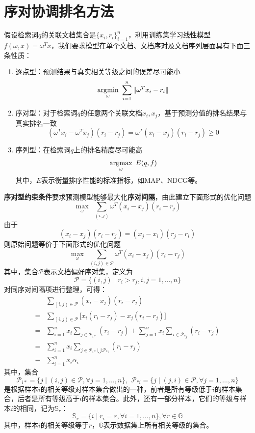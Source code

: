 \section{序对协调排名方法}
假设检索词$q$的关联文档集合是$\{x_i,r_i\}_{i=1}^n$，利用训练集学习线性模型$f(\omega,x)=\omega^T x$，我们要求模型在单个文档、文档序对及文档序列层面具有下面三条性质：
\begin{enumerate}
  \item 逐点型：预测结果与真实相关等级之间的误差尽可能小
  \[
    \operatorname*{\mathrm{\arg\!\min}}\limits_{\omega}~\sum\limits_{i=1}^n \|\omega^T x_i - r_i\|
  \]
  \item 序对型：对于检索词$q$的任意两个关联文档$x_i,x_j$，基于预测分值的排名结果与真实排名一致
  \[
    (\omega^T x_i - \omega^T x_j)(r_i - r_j) = \omega^T (x_i - x_j)(r_i - r_j) \ge 0
  \]
  \item 序列型：在检索词$q$上的排名精度尽可能高
  \[
    \operatorname*{\mathrm{\arg\!\max}}\limits_{\omega}~E(q,f)
  \]
  其中，$E$表示衡量排序性能的标准指标，如MAP、NDCG等。
\end{enumerate}

\textbf{序对型约束条件}要求预测模型能够最大化\textbf{序对间隔}，由此建立下面形式的优化问题
\[
  \max\limits_{\omega} ~~\sum\limits_{(i,j)} \omega^T (x_i - x_j)(r_i - r_j)
\]
由于
\[
    (x_i - x_j)(r_i - r_j) = (x_j - x_i)(r_j - r_i)
\]
则原始问题等价于下面形式的优化问题
\begin{equation}\label{eq:clr}
  \max\limits_{\omega} ~~\sum\limits_{(i,j) \in \mathscr P} \omega^T (x_i - x_j)(r_i - r_j)
\end{equation}
其中，集合$\mathscr P$表示文档偏好序对集，定义为
\[
   \mathscr P = \{(i,j)\mid r_i > r_j, i,j = 1,\ldots, n\}
\]
对同序对间隔项进行整理，可得：
\begin{equation}\label{eq:concordantmargin}
 \begin{array}{ll}
    & \sum\limits_{(i,j) \in \mathscr P} (x_i - x_j)(r_i - r_j) \\
    = & \sum\limits_{(i,j) \in \mathscr P} \bigg[ x_i(r_i - r_j) - x_j(r_i - r_j)\bigg] \\
    = & \sum\limits_{i=1}^n x_i \sum\limits_{j\in \mathscr P_{i*}} (r_i - r_j) + \sum\limits_{j=1}^n x_i \sum\limits_{i\in \mathscr P_{*j}} (r_i - r_j) \\
    = & \sum\limits_{i=1}^n x_i \sum\limits_{j\in \mathscr P_{i*}\bigcup \mathscr P_{*i}} (r_i - r_j)\\
    \equiv & \sum\limits_{i=1}^n x_i \alpha_i
 \end{array}
\end{equation}
其中，集合
\[
    \mathscr P_{i*} = \{j\mid (i,j)\in \mathscr P, \forall j=1,\ldots,n\},~~\mathscr P_{*i} = \{j\mid (j,i)\in \mathscr P, \forall j=1,\ldots,n\}
\]
是根据样本$i$的相关等级对样本集合做出的一种，前者是所有等级低于$i$的样本集合，后者是所有等级高于$i$的样本集合。此外，还有一部分样本，它们的等级与样本$i$的相同，记为$\mathbb{S}_r$：
\begin{equation}
    \mathbb{S}_r = \{i\mid r_i = r, \forall i=1,\ldots,n\}, \forall r\in \mathbb{G}
\end{equation}
其中，样本$i$的相关等级等于$r$，$\mathbb{G}$表示数据集上所有相关等级的集合。

